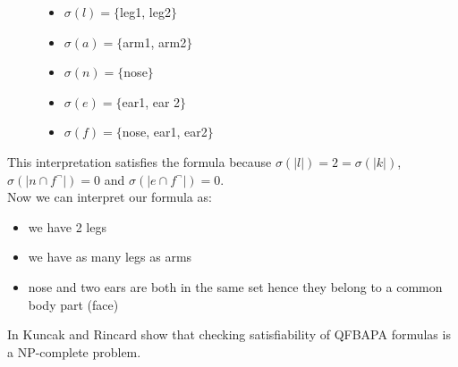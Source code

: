 \documentclass{book}
\theoremstyle{break}
\theoremstyle{definition}
\begin{document}
\begin{figure}[H]
\begin{minipage}[t]{0.5\textwidth}
\raggedright
\begin{itemize}
\item $\sigma(l)=\{$leg1, leg2$\}$
\item $\sigma(a)=\{$arm1, arm2$\}$
\end{itemize}
\end{minipage}%
\begin{minipage}[t]{0.5\textwidth}
\raggedright
\begin{itemize}
\item $\sigma(n)=\{$nose$\}$
\item $\sigma(e)=\{$ear1, ear 2$\}$
\item $\sigma(f)=\{$nose, ear1, ear2$\}$
\end{itemize}
\end{minipage}
\end{figure}
This interpretation satisfies the formula because $\sigma(|l|)=2=\sigma(|k|)$, $\sigma(|n\cap f^\neg|)=0$ and $\sigma(|e\cap f^\neg|)=0$.\\
Now we can interpret our formula as: 
\begin{itemize}
\item we have 2 legs
\item we have as many legs as arms
\item nose and two ears are both in the same set hence they belong to a common body part (face)
\end{itemize}
In \cite{KuncakRinard} Kuncak and Rincard show that checking satisfiability of QFBAPA formulas is a NP-complete problem.
\end{document}
